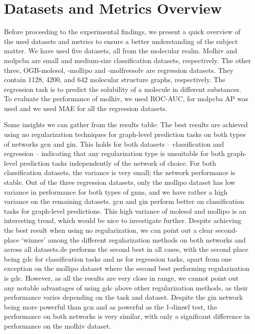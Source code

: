\section{Datasets and Metrics Overview}

Before proceeding to the experimental findings, we present a quick overview of the used datasets and metrics to ensure a better understanding of the subject matter. We have used five datasets, all from the molecular realm. Molhiv and molpcba are small and medium-size classification datasets, respectively.
The other three, OGB-molesol, -mollipo and -molfreesolv are regression datasets. They contain 1128, 4200, and 642
molecular structure graphs, respectively. The regression task is to predict the solubility
of a molecule in different substances.
To evaluate the performance of molhiv, we used ROC-AUC, for molpcba AP was used and we used MAE for all the regression datasets.

Some insights we can gather from the results table:
The best results are achieved using no regularization techniques for graph-level prediction tasks on both types of networks \ac{gcn} and \ac{gin}. This holds for both datasets -- classification and regression -- indicating that any regularization type is unsuitable for both graph-level prediction tasks independently of the network of choice.
For both classification datasets, the variance is very small; the network performance is stable. Out of the three regression datasets, only the mollipo dataset has low variance in performance for both types of \acp{gnn}, and we have rather a high variance on the remaining datasets. \ac{gcn} and \ac{gin} perform better on classification tasks for graph-level predictions. This high variance of molesol and mollipo is an interesting trend, which would be nice to investigate further.
Despite achieving the best result when using no regularization, we can point out a clear second-place `winner' among the different regularization methods on both networks and across all datasets.\ac{de} performs the second best in all cases, with the second place being \ac{gdc} for classification tasks and \ac{ns} for regression tasks, apart from one exception on the mollipo dataset where the second best performing regularization is \ac{gdc}. However, as all the results are very close in range, we cannot point out any notable advantages of using \ac{gdc} above other regularization methods, as their performance varies depending on the task and dataset.
Despite the \ac{gin} network being more powerful than \ac{gcn} and as powerful as the 1-dim\ac{wl} test, the performance on both networks is very similar, with only a significant difference in performance on the molhiv dataset.

